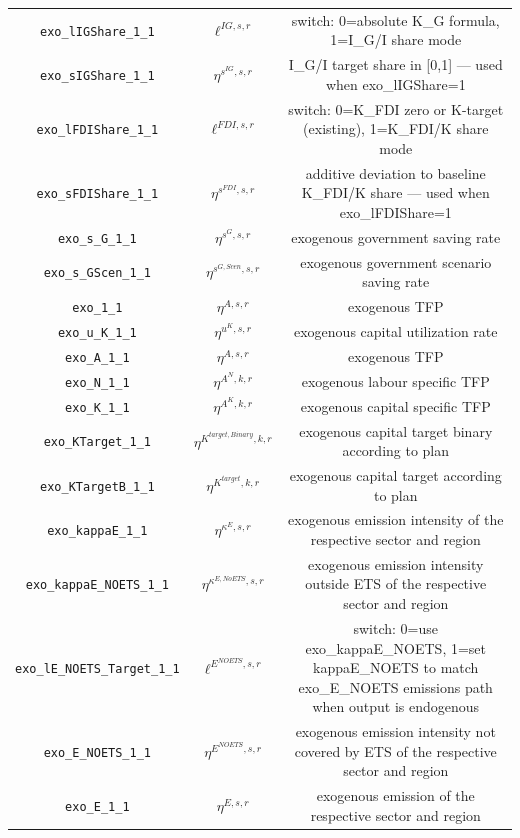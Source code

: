 \begin{center}
\begin{longtable}{ccc}
\texttt{exo\_lIGShare\_1\_1} & ${\ell^{IG,s,r}}$ & switch: 0=absolute K\_G formula, 1=I\_G/I share mode\\
\texttt{exo\_sIGShare\_1\_1} & ${\eta^{s^{IG},s,r}}$ & I\_G/I target share in [0,1] — used when exo\_lIGShare=1\\
\texttt{exo\_lFDIShare\_1\_1} & ${\ell^{FDI,s,r}}$ & switch: 0=K\_FDI zero or K-target (existing), 1=K\_FDI/K share mode\\
\texttt{exo\_sFDIShare\_1\_1} & ${\eta^{s^{FDI},s,r}}$ & additive deviation to baseline K\_FDI/K share — used when exo\_lFDIShare=1\\
\texttt{exo\_s\_G\_1\_1} & ${\eta^{s^G,s,r}}$ & exogenous government saving rate\\
\texttt{exo\_s\_GScen\_1\_1} & ${\eta^{s^{G,Scen},s,r}}$ & exogenous government scenario saving rate\\
\texttt{exo\_1\_1} & ${\eta^{A,s,r}}$ & exogenous TFP\\
\texttt{exo\_u\_K\_1\_1} & ${\eta^{u^K,s,r}}$ & exogenous capital utilization rate\\
\texttt{exo\_A\_1\_1} & ${\eta^{A,s,r}}$ & exogenous TFP\\
\texttt{exo\_N\_1\_1} & ${\eta^{A^{N},k,r}}$ & exogenous labour specific TFP\\
\texttt{exo\_K\_1\_1} & ${\eta^{A^{K},k,r}}$ & exogenous capital specific TFP\\
\texttt{exo\_KTarget\_1\_1} & ${\eta^{K^{target,Binary},k,r}}$ & exogenous capital target binary according to plan\\
\texttt{exo\_KTargetB\_1\_1} & ${\eta^{K^{target},k,r}}$ & exogenous capital target according to plan\\
\texttt{exo\_kappaE\_1\_1} & ${\eta^{\kappa^{E},s,r}}$ & exogenous emission intensity of the respective sector and region\\
\texttt{exo\_kappaE\_NOETS\_1\_1} & ${\eta^{\kappa^{E,No ETS},s,r}}$ & exogenous emission intensity outside ETS of the respective sector and region\\
\texttt{exo\_lE\_NOETS\_Target\_1\_1} & ${\ell^{E^{NOETS},s,r}}$ & switch: 0=use exo\_kappaE\_NOETS, 1=set kappaE\_NOETS to match exo\_E\_NOETS emissions path when output is endogenous\\
\texttt{exo\_E\_NOETS\_1\_1} & ${\eta^{E^{NOETS},s,r}}$ & exogenous emission intensity not covered by ETS of the respective sector and region\\
\texttt{exo\_E\_1\_1} & ${\eta^{E,s,r}}$ & exogenous emission of the respective sector and region\\

\end{longtable}
\end{center}

